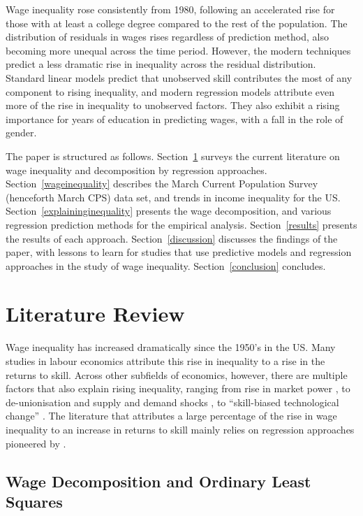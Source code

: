 \documentclass[notitlepage,12pt]{article}
\newcommand{\1}[1]{\ensuremath{\mathbb{1}\left( #1 \right)}}               %
\begin{document}
Wage inequality rose consistently from 1980, following an accelerated rise for those with at least a college degree compared to the rest of the population.  The distribution of residuals in wages rises regardless of prediction method, also becoming more unequal across the time period.  However, the modern techniques predict a less dramatic rise in inequality across the residual distribution.  Standard linear models predict that unobserved skill contributes the most of any component to rising inequality, and modern regression models attribute even more of the rise in inequality to unobserved factors.  They also exhibit a rising importance for years of education in predicting wages, with a fall in the role of gender.

The paper is structured as follows.
Section~\ref{literaturereview} surveys the current literature on wage inequality and decomposition by regression approaches.
Section~\ref{wageinequality} describes the March Current Population Survey (henceforth March CPS) data set, and trends in income inequality for the US.
Section~\ref{explaininginequality} presents the wage decomposition, and various regression prediction methods for the empirical analysis.
Section~\ref{results} presents the results of each approach.
Section~\ref{discussion} discusses the findings of the paper, with lessons to learn for studies that use predictive models and regression approaches in the study of wage inequality.
Section~\ref{conclusion} concludes.

\section{Literature Review}
\label{literaturereview}
Wage inequality has increased dramatically since the 1950's in the US.  Many studies in labour economics attribute this rise in inequality to a rise in the returns to skill.  Across other subfields of economics, however, there are multiple factors that also explain rising inequality, ranging from rise in market power \citep{furman2015firm}, to de-unionisation and supply and demand shocks \citep{DML95}, to ``skill-biased technological change'' \citep{acemoglu1998new,acemoglu2002technical}.  The literature that attributes a large percentage of the rise in wage inequality to an increase in returns to skill mainly relies on regression approaches pioneered by \cite{mincer1958investment,mincer1974schooling}.

\subsection{Wage Decomposition and Ordinary Least Squares}
\end{document}
